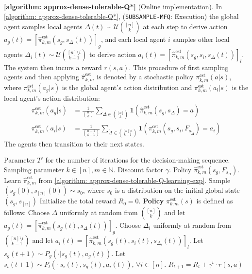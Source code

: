 \documentclass{article}
\theoremstyle{plain}
\theoremstyle{definition}
\def\est{\mathrm{est}}
\begin{document}
\textbf{\cref{algorithm: approx-dense-tolerable-Q*}} (Online implementation). In \cref{algorithm: approx-dense-tolerable-Q*}, (\texttt{SUBSAMPLE-MFQ}: Execution) the global agent samples local agents $\Delta(t) \sim\mathcal{U}\binom{[n]}{k}$ at each step to derive action $a_g(t) =[\hat{\pi}_{k,m}^\est(s_g,s_\Delta(t))]_g$, and each local agent $i$ samples other local agents $\Delta_i(t)\sim \mathcal{U}{[n]\setminus i\choose k-1}$ to derive action $a_i(t) = [\hat{\pi}_{k,m}^\est(s_g,s_i,s_\Delta(t))]_l$. The system then incurs a reward $r(s,a)$. This procedure of first sampling agents and then applying $\hat{\pi}^\est_{k,m}$ is denoted by a stochastic policy ${\pi}_{k,m}^\est(a|s)$, where ${\pi}_{k,m}^\est(a_g|s)$ is the global agent's action distribution and ${\pi}_{k,m}^\est(a_l|s)$ is the local agent's action distribution:
\begin{align}\!\!{\pi}_{k,m}^\est(a_g|s)\!&=\! \frac{1}{\binom{n}{k}}\sum_{\Delta\in \binom{[n]}{k}} \mathbf{1}(\hat{\pi}_{k,m}^\est(s_g,s_\Delta)=a )\\ \!\!{\pi}_{k,m}^\est(a_i|s)\!&=\!\frac{1}{\binom{n-1}{k-1}}\!\!\sum_{\tilde{\Delta}\in \binom{[n]\setminus i}{k-1}} \!\!\!\!\mathbf{1}({\pi}_{k,m}^\est(s_g,s_i,F_{s_{\tilde{\Delta}}})\!=\!a_i)\!
\end{align}
The agents then transition to their next states.
\begin{algorithm}[t]
\caption{\texttt{SUBSAMPLE-MFQ}: Execution} \label{algorithm: approx-dense-tolerable-Q*}
\begin{algorithmic}[1]
\REQUIRE Parameter $T'$ for the number of iterations for the decision-making sequence. Sampling parameter $k \in [n], m\in\mathbb{N}$. Discount factor $\gamma$. Policy $\hat{\pi}^\est_{k,m}(s_g, F_{s_\Delta})$.
\STATE Learn $\hat{\pi}_{k,m}^\est$ from \cref{algorithm: approx-dense-tolerable-Q-learning-exp}.
\STATE Sample $(s_g(0), s_{[n]}(0)) \sim s_0$, where $s_0$ is a distribution on the initial global state $(s_g, s_{{[n]}})$
\STATE Initialize the total reward $R_0=0$.
\STATE \textbf{Policy} $\pi_{k,m}^\est(s)$ is defined as follows:
\STATE Choose $\Delta$ uniformly at random from ${[n] \choose k}$ and let $a_g(t) = [\hat{\pi}_{k,m}^\est(s_g(t),s_\Delta(t))]_g$.
\STATE Choose $\Delta_i$ uniformly at random from ${[n]\setminus i\choose k-1}$ and let $a_i(t) = [\hat{\pi}_{k,m}^\est(s_g(t), s_i(t), s_{\Delta_i}(t))]_{l}$.
\ENDFOR
\STATE Let $s_g(t+1) \sim P_g(\cdot|s_g(t), a_g(t))$.
\STATE Let $s_i(t+1) \sim P_l(\cdot|s_i(t), s_g(t),a_i(t))$, $\forall i\in [n]$.
\STATE $R_{t+1} = R_t + \gamma^t \cdot r(s,a)$
\ENDFOR
\end{algorithmic}
\end{algorithm}     
\end{document}
